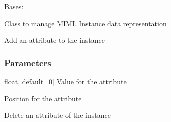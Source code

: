 \documentclass[letterpaper,10pt,english]{sphinxmanual}
\begin{document}
\begin{fulllineitems}
\label{\detokenize{data/_autosummary/miml.data.instance.Instance:miml.data.instance.Instance}}
\pysigstartsignatures
{}
\pysigstopsignatures
\sphinxAtStartPar
Bases: 

\sphinxAtStartPar
Class to manage MIML Instance data representation

\begin{fulllineitems}
\label{\detokenize{data/_autosummary/miml.data.instance.Instance:miml.data.instance.Instance.add_attribute}}
\pysigstartsignatures
{}
\pysigstopsignatures
\sphinxAtStartPar
Add an attribute to the instance


\subsubsection{Parameters}
\label{\detokenize{data/_autosummary/miml.data.instance.Instance:parameters}}\begin{description}
\sphinxlineitem{value}{[}float, default=0{]}
\sphinxAtStartPar
Value for the attribute

\sphinxAtStartPar
Position for the attribute

\end{description}

\end{fulllineitems}


\begin{fulllineitems}
\label{\detokenize{data/_autosummary/miml.data.instance.Instance:miml.data.instance.Instance.delete_attribute}}
\pysigstartsignatures
{}
\pysigstopsignatures
\sphinxAtStartPar
Delete an attribute of the instance



\end{fulllineitems}
\end{fulllineitems}
\end{document}
